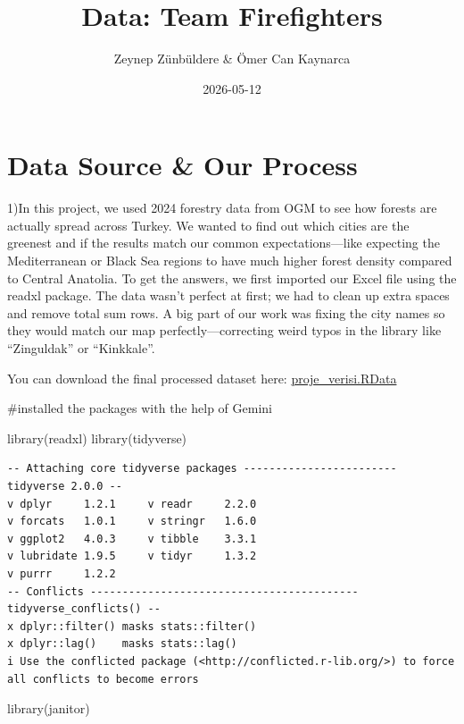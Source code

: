 \documentclass[
  11pt,
  a4paper,
  DIV=11,
  numbers=noendperiod]{scrartcl}
\title{Data: Team Firefighters}
\author{Zeynep Zünbüldere \& Ömer Can Kaynarca}
\date{2026-05-12}
\newenvironment{Shaded}{\begin{snugshade}}{\end{snugshade}}
\newcommand{\FunctionTok}[1]{\textcolor[rgb]{0.28,0.35,0.67}{#1}}
\newcommand{\NormalTok}[1]{\textcolor[rgb]{0.00,0.23,0.31}{#1}}
\begin{document}
\maketitle


\section{Data Source \& Our Process}\label{data-source-our-process}

1)In this project, we used 2024 forestry data from OGM to see how
forests are actually spread across Turkey. We wanted to find out which
cities are the greenest and if the results match our common
expectations---like expecting the Mediterranean or Black Sea regions to
have much higher forest density compared to Central Anatolia. To get the
answers, we first imported our Excel file using the readxl package. The
data wasn't perfect at first; we had to clean up extra spaces and remove
total sum rows. A big part of our work was fixing the city names so they
would match our map perfectly---correcting weird typos in the library
like ``Zinguldak'' or ``Kinkkale''.

You can download the final processed dataset here:
\url{proje_verisi.RData}

\#installed the packages with the help of Gemini

\begin{Shaded}
\begin{Highlighting}[]
\FunctionTok{library}\NormalTok{(readxl)}
\FunctionTok{library}\NormalTok{(tidyverse)}
\end{Highlighting}
\end{Shaded}

\begin{verbatim}
-- Attaching core tidyverse packages ------------------------ tidyverse 2.0.0 --
v dplyr     1.2.1     v readr     2.2.0
v forcats   1.0.1     v stringr   1.6.0
v ggplot2   4.0.3     v tibble    3.3.1
v lubridate 1.9.5     v tidyr     1.3.2
v purrr     1.2.2     
-- Conflicts ------------------------------------------ tidyverse_conflicts() --
x dplyr::filter() masks stats::filter()
x dplyr::lag()    masks stats::lag()
i Use the conflicted package (<http://conflicted.r-lib.org/>) to force all conflicts to become errors
\end{verbatim}

\begin{Shaded}
\begin{Highlighting}[]
\FunctionTok{library}\NormalTok{(janitor)}
\end{Highlighting}
\end{Shaded}
\end{document}
